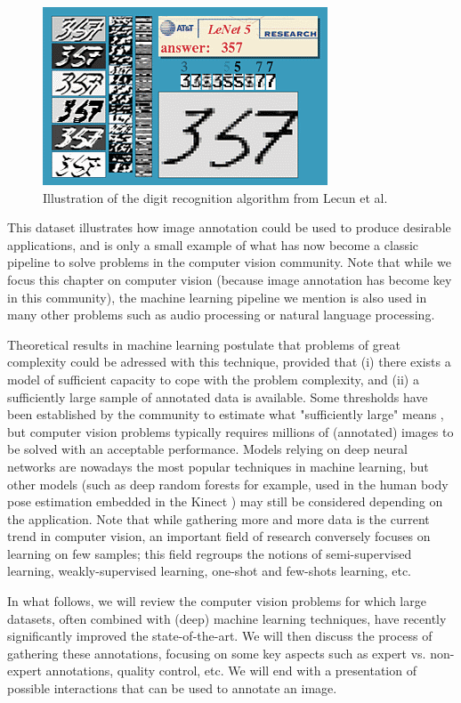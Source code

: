 \begin{figure}[ht]
\centering
\includegraphics[width=0.5\columnwidth]{assets/img/lenet-results.png}
\caption{Illustration of the digit recognition algorithm from Lecun et al. \cite{lecun1998gradient}}%
\label{fig:lenet}
\end{figure}


This dataset illustrates how image annotation could be used to produce desirable applications, and is only a small example of what has now become a classic pipeline to solve problems in the computer vision community. Note that while we focus this chapter on computer vision (because image annotation has become key in this community), the machine learning pipeline we mention is also used in many other problems such as audio processing or natural language processing. 

Theoretical results in machine learning postulate that problems of great complexity could be adressed with this technique, provided that (i) there exists a model of sufficient capacity to cope with the problem complexity, and (ii) a sufficiently large sample of annotated data is available. Some thresholds have been established by the community to estimate what "sufficiently large" means \cite{raudys1991small, jain198239}, but computer vision problems typically requires millions of (annotated) images to be solved with an acceptable performance. Models relying on deep neural networks are nowadays the most popular techniques in machine learning, but other models (such as deep random forests for example, used in the human body pose estimation embedded in the Kinect \cite{shotton2011real}) may still be considered depending on the application. Note that while gathering more and more data is the current trend in computer vision, an important field of research conversely focuses on learning on few samples; this field regroups the notions of semi-supervised learning, weakly-supervised learning, one-shot and few-shots learning, etc. 

In what follows, we will review the computer vision problems for which large datasets, often combined with (deep) machine learning techniques, have recently significantly improved the state-of-the-art. We will then discuss the process of gathering these annotations, focusing on some key aspects such as expert vs. non-expert annotations, quality control, etc. We will end with a presentation of possible interactions that can be used to annotate an image. 

